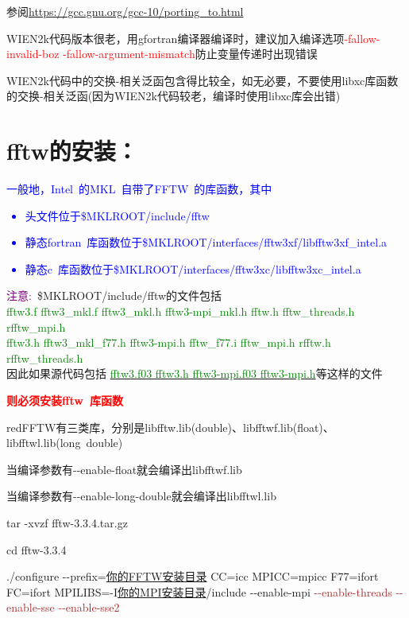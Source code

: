 \documentclass[10pt,a4paper]{article}
\begin{document}
参阅\url{https://gcc.gnu.org/gcc-10/porting_to.html}

\textrm{WIEN2k}代码版本很老，用\textrm{gfortran}编译器编译时，建议加入编译选项\textcolor{red}{-fallow-invalid-boz -fallow-argument-mismatch}防止变量传递时出现错误

\textrm{WIEN2k}代码中的交换-相关泛函包含得比较全，如无必要，不要使用\textrm{libxc}库函数的交换-相关泛函(因为\textrm{WIEN2k}代码较老，编译时使用\textrm{libxc}库会出错)

\section{fftw的安装：}
\textcolor{blue}{一般地，\textrm{Intel~}的\textrm{MKL~}自带了\textrm{FFTW~}的库函数，其中
\begin{itemize}
	\item 头文件位于\;\$MKLROOT/include/fftw
	\item 静态\textrm{fortran~}库函数位于\;\$MKLROOT/interfaces/fftw3xf/libfftw3xf\_intel.a
	\item 静态\textrm{c~}库函数位于\;\$MKLROOT/interfaces/fftw3xc/libfftw3xc\_intel.a
\end{itemize}}

\textcolor{purple}{注意:~}\$MKLROOT/include/fftw的文件包括\\
\textcolor{green}{fftw3.f\;\;  fftw3\_mkl.f\;\;   fftw3\_mkl.h\;\;  fftw3-mpi\_mkl.h\;\;  fftw.h \;\;    fftw\_threads.h\;\;  rfftw\_mpi.h \\
	fftw3.h\;\;  fftw3\_mkl\_f77.h\;\;  fftw3-mpi.h\;\;  fftw\_f77.i \;\;      fftw\_mpi.h \;\; rfftw.h  \;\;       rfftw\_threads.h
}\\
因此如果源代码包括 \underline{\textcolor{green}{fftw3.f03\;\; fftw3.h\;\; fftw3-mpi.f03\;\; fftw3-mpi.h}}等这样的文件

\textbf{\textcolor{red}{则必须安装\textrm{fftw~}库函数}}

\textcolor{color}{red}{\textrm{FFTW}有三类库，分别是\textrm{libfftw.lib}(\textrm{double})、\textrm{libfftwf.lib}(\textrm{float})、libfftwl.lib(\textrm{long~double})}

当编译参数有\textrm{-\/-enable-float}就会编译出\textrm{libfftwf.lib}

当编译参数有\textrm{-\/-enable-long-double}就会编译出\textrm{libfftwl.lib}

tar -xvzf fftw-3.3.4.tar.gz

cd fftw-3.3.4

./configure -\/-prefix=\underline{你的FFTW安装目录} CC=icc MPICC=mpicc F77=ifort FC=ifort MPILIBS=-I\underline{你的MPI安装目录}/include -\/-enable-mpi \textcolor{brown}{-\/-enable-threads -\/-enable-sse -\/-enable-sse2}
\end{document}
